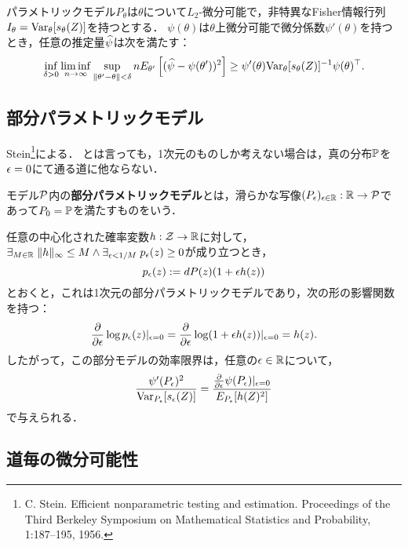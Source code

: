 \documentclass[uplatex,dvipdfmx]{jsreport}
\renewcommand{\Z}{\mathcal{Z}}
\begin{document}
\begin{theorem}
    パラメトリックモデル$P_\theta$は$\theta$について$L_2$-微分可能で，非特異なFisher情報行列$I_\theta=\Var_\theta[s_\theta(Z)]$を持つとする．
    $\psi(\theta)$は$\theta$上微分可能で微分係数$\psi'(\theta)$を持つとき，任意の推定量$\wh{\psi}$は次を満たす：
    \[\inf_{\delta>0}\liminf_{n\to\infty}\sup_{\norm{\theta'-\theta}<\delta}nE_{\theta'}\Square{(\wh{\psi}-\psi(\theta'))^2}\ge\psi'(\theta)\Var_\theta[s_\theta(Z)]^{-1}\psi(\theta)^\top.\]
\end{theorem}

\subsection{部分パラメトリックモデル}

\begin{tcolorbox}[colframe=ForestGreen, colback=ForestGreen!10!white,breakable,colbacktitle=ForestGreen!40!white,coltitle=black,fonttitle=\bfseries\sffamily,
title=]
    Stein\footnote{C. Stein. Efficient nonparametric testing and estimation. Proceedings of the Third Berkeley
    Symposium on Mathematical Statistics and Probability, 1:187–195, 1956.}による．
    とは言っても，1次元のものしか考えない場合は，真の分布$\bP$を$\ep=0$にて通る道に他ならない．
\end{tcolorbox}

\begin{definition}
    モデル$\P$内の\textbf{部分パラメトリックモデル}とは，滑らかな写像$(P_\ep)_{\ep\in\R}:\R\to\P$であって$P_0=\bP$を満たすものをいう．
\end{definition}

\begin{example}
    任意の中心化された確率変数$h:\Z\to\R$に対して，$\exists_{M\in\R}\;\norm{h}_\infty\le M\land\exists_{\ep<1/M}\;p_\ep(z)\ge0$が成り立つとき，
    \[p_\ep(z):=dP(z)(1+\ep h(z))\]
    とおくと，これは1次元の部分パラメトリックモデルであり，次の形の影響関数を持つ：
    \[\pp{}{\ep}\log p_\ep(z)|_{\ep=0}=\pp{}{\ep}\log(1+\ep h(z))|_{\ep=0}=h(z).\]
    したがって，この部分モデルの効率限界は，任意の$\ep\in\R$について，
    \[\frac{\psi'(P_\ep)^2}{\Var_{P_\ep}[s_\ep(Z)]}=\frac{\pp{}{\ep}\psi(P_\ep)|_{\ep=0}}{E_{P_\ep}[h(Z)^2]}\]
    で与えられる．
\end{example}

\subsection{道毎の微分可能性}
\end{document}
